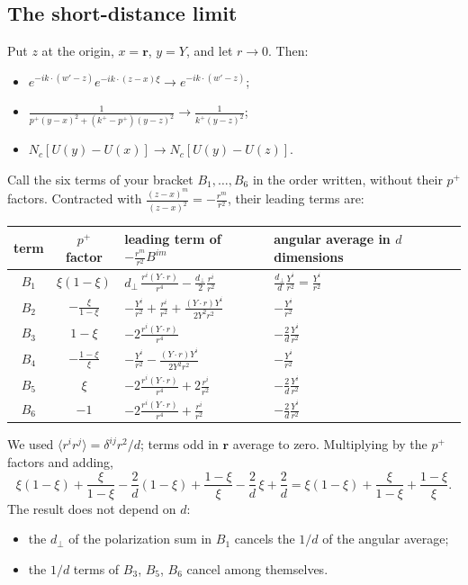 \documentclass[10pt]{article}
\numberwithin{equation}{section}
\begin{document}
\subsection{The short-distance limit}\label{sec:short}
Put $z$ at the origin, $x=\mathbf r$, $y=Y$, and let $r\to0$. Then:
\begin{itemize}
\item $e^{-ik\cdot(w'-z)}e^{-ik\cdot(z-x)\xi}\to e^{-ik\cdot(w'-z)}$;
\item $\frac{1}{p^+(y-x)^2+(k^+-p^+)(y-z)^2}\to\frac{1}{k^+(y-z)^2}$;
\item $N_c[U(y)-U(x)]\to N_c[U(y)-U(z)]$.
\end{itemize}
Call the six terms of your bracket $B_1,\dots,B_6$ in the order written, without their $p^+$ factors. Contracted with $\frac{(z-x)^m}{(z-x)^2}=-\frac{r^m}{r^2}$, their leading terms are:
\begin{center}\small
\begin{tabular}{@{}c c l l@{}}
term & $p^+$ factor & leading term of $-\frac{r^m}{r^2}B^{im}$ & angular average in $d$ dimensions\\ \hline
$B_1$ & $\xi(1-\xi)$ & $d_\perp\,\frac{r^i(Y\cdot r)}{r^4}-\frac{d_\perp}{2}\frac{r^i}{r^2}$ & $\frac{d_\perp}{d}\frac{Y^i}{r^2}=\frac{Y^i}{r^2}$\\
$B_2$ & $-\frac{\xi}{1-\xi}$ & $-\frac{Y^i}{r^2}+\frac{r^i}{r^2}+\frac{(Y\cdot r)Y^i}{2Y^2r^2}$ & $-\frac{Y^i}{r^2}$\\
$B_3$ & $1-\xi$ & $-2\frac{r^i(Y\cdot r)}{r^4}$ & $-\frac2d\frac{Y^i}{r^2}$\\
$B_4$ & $-\frac{1-\xi}{\xi}$ & $-\frac{Y^i}{r^2}-\frac{(Y\cdot r)Y^i}{2Y^2r^2}$ & $-\frac{Y^i}{r^2}$\\
$B_5$ & $\xi$ & $-2\frac{r^i(Y\cdot r)}{r^4}+2\frac{r^i}{r^2}$ & $-\frac2d\frac{Y^i}{r^2}$\\
$B_6$ & $-1$ & $-2\frac{r^i(Y\cdot r)}{r^4}+\frac{r^i}{r^2}$ & $-\frac2d\frac{Y^i}{r^2}$\\
\end{tabular}
\end{center}
We used $\langle r^ir^j\rangle=\delta^{ij}r^2/d$; terms odd in $\mathbf r$ average to zero. Multiplying by the $p^+$ factors and adding,
\begin{equation}
\xi(1-\xi)+\frac{\xi}{1-\xi}-\frac2d(1-\xi)+\frac{1-\xi}{\xi}-\frac2d\,\xi+\frac2d
=\xi(1-\xi)+\frac{\xi}{1-\xi}+\frac{1-\xi}{\xi}.
\end{equation}
The result does not depend on $d$:
\begin{itemize}
\item the $d_\perp$ of the polarization sum in $B_1$ cancels the $1/d$ of the angular average;
\item the $1/d$ terms of $B_3$, $B_5$, $B_6$ cancel among themselves.
\end{itemize}
\end{document}

